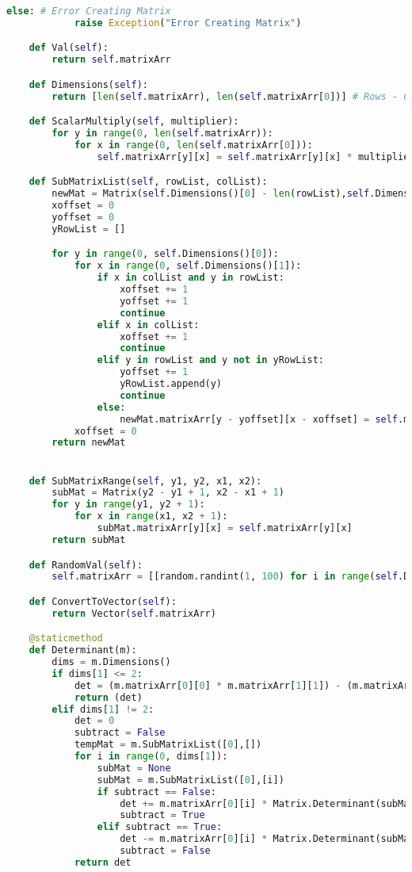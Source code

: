 \begin{flushleft}
\begin{enumerate}
\begin{lstlisting}[language=Python]
        else: # Error Creating Matrix
            raise Exception("Error Creating Matrix")

    def Val(self):
        return self.matrixArr

    def Dimensions(self):
        return [len(self.matrixArr), len(self.matrixArr[0])] # Rows - Columns

    def ScalarMultiply(self, multiplier):
        for y in range(0, len(self.matrixArr)):
            for x in range(0, len(self.matrixArr[0])):
                self.matrixArr[y][x] = self.matrixArr[y][x] * multiplier

    def SubMatrixList(self, rowList, colList):
        newMat = Matrix(self.Dimensions()[0] - len(rowList),self.Dimensions()[1] - len(colList))
        xoffset = 0
        yoffset = 0
        yRowList = []

        for y in range(0, self.Dimensions()[0]):
            for x in range(0, self.Dimensions()[1]):
                if x in colList and y in rowList:
                    xoffset += 1
                    yoffset += 1
                    continue
                elif x in colList:
                    xoffset += 1
                    continue
                elif y in rowList and y not in yRowList:
                    yoffset += 1
                    yRowList.append(y)
                    continue
                else:
                    newMat.matrixArr[y - yoffset][x - xoffset] = self.matrixArr[y][x]
            xoffset = 0
        return newMat


    def SubMatrixRange(self, y1, y2, x1, x2):
        subMat = Matrix(y2 - y1 + 1, x2 - x1 + 1)
        for y in range(y1, y2 + 1):
            for x in range(x1, x2 + 1):
                subMat.matrixArr[y][x] = self.matrixArr[y][x]
        return subMat

    def RandomVal(self):
        self.matrixArr = [[random.randint(1, 100) for i in range(self.Dimensions()[1])] for j in range(self.Dimensions()[0])]

    def ConvertToVector(self):
        return Vector(self.matrixArr)

    @staticmethod
    def Determinant(m):
        dims = m.Dimensions()
        if dims[1] <= 2:
            det = (m.matrixArr[0][0] * m.matrixArr[1][1]) - (m.matrixArr[0][1] * m.matrixArr[1][0])
            return (det)
        elif dims[1] != 2:
            det = 0
            subtract = False
            tempMat = m.SubMatrixList([0],[])
            for i in range(0, dims[1]):
                subMat = None
                subMat = m.SubMatrixList([0],[i])
                if subtract == False:
                    det += m.matrixArr[0][i] * Matrix.Determinant(subMat)
                    subtract = True
                elif subtract == True:
                    det -= m.matrixArr[0][i] * Matrix.Determinant(subMat)
                    subtract = False
            return det


\end{lstlisting}
\end{enumerate}
\end{flushleft}
